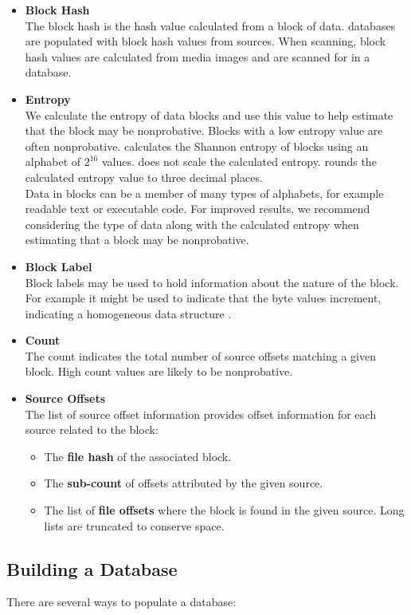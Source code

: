 \documentclass[11pt,fleqn]{article} %
\begin{document}
\begin{itemize}
\item \textbf{Block Hash}\\
The block hash is the hash value calculated from a block of data. \hdb databases are populated with block hash values from sources. When scanning, block hash values are calculated from media images and are scanned for in a \hdb database.
\item \textbf{Entropy}\\
We calculate the entropy of data blocks and use this value to help estimate that the block may be nonprobative. Blocks with a low entropy value are often nonprobative. \hdb calculates the Shannon entropy of blocks using an alphabet of $2^{16}$ values. \hdb does not scale the calculated entropy. \hdb rounds the calculated entropy value to three decimal places.\\

Data in blocks can be a member of many types of alphabets, for example readable text or executable code. For improved results, we recommend considering the type of data along with the calculated entropy when estimating that a block may be nonprobative.
\item \textbf{Block Label}\\
Block labels may be used to hold information about the nature of the block.  For example it might be used to indicate that the byte values increment, indicating a homogeneous data structure \cite{hashBasedCarving}.
\item \textbf{Count}\\
The count indicates the total number of source offsets matching a given block. High count values are likely to be nonprobative.
\item \textbf{Source Offsets}\\
The list of source offset information provides offset information for each source related to the block:
  \begin{itemize}
  \item The \textbf{file hash} of the associated block.
  \item The \textbf{sub-count} of offsets attributed by the given source.
  \item The list of \textbf{file offsets} where the block is found in the given source. Long lists are truncated to conserve space.
  \end{itemize}
\end{itemize}

\subsection{Building a \hdb Database}
There are several ways to populate a database:
\end{document}
